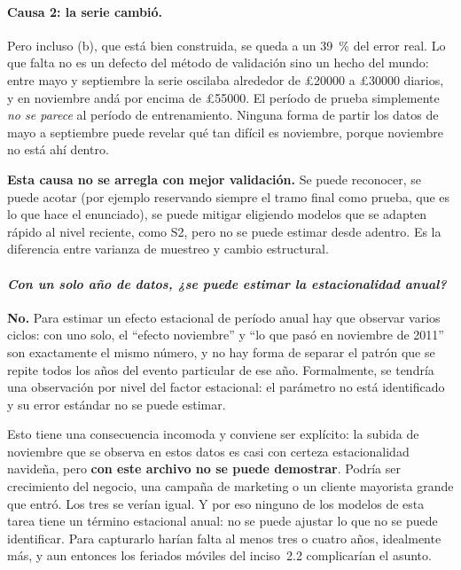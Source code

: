 \documentclass[11pt]{article}
\newcommand{\gbp}{\pounds}
\begin{document}
\paragraph{Causa 2: la serie cambi\'o.} Pero incluso (b), que est\'a bien
construida, se queda a un \SI{39}{\percent} del error real. Lo que falta no
es un defecto del m\'etodo de validaci\'on sino un hecho del mundo: entre
mayo y septiembre la serie oscilaba alrededor de \gbp\num{20000} a
\gbp\num{30000} diarios, y en noviembre and\'a por encima de
\gbp\num{55000}. El per\'iodo de prueba simplemente \emph{no se parece} al
per\'iodo de entrenamiento. Ninguna forma de partir los datos de mayo a
septiembre puede revelar qu\'e tan dif\'icil es noviembre, porque noviembre
no est\'a ah\'i dentro.

\textbf{Esta causa no se arregla con mejor validaci\'on.} Se puede
reconocer, se puede acotar (por ejemplo reservando siempre el tramo final
como prueba, que es lo que hace el enunciado), se puede mitigar eligiendo
modelos que se adapten r\'apido al nivel reciente, como S2, pero no se puede
estimar desde adentro. Es la diferencia entre varianza de muestreo y cambio
estructural.

\paragraph{{\normalfont\itshape Con un solo a\~no de datos, ¿se puede
estimar la estacionalidad anual?}} \textbf{No.} Para estimar un efecto
estacional de per\'iodo anual hay que observar varios ciclos: con uno solo,
el ``efecto noviembre'' y ``lo que pas\'o en noviembre de 2011'' son
exactamente el mismo n\'umero, y no hay forma de separar el patr\'on que se
repite todos los a\~nos del evento particular de ese a\~no. Formalmente, se
tendr\'ia una observaci\'on por nivel del factor estacional: el par\'ametro
no est\'a identificado y su error est\'andar no se puede estimar.

Esto tiene una consecuencia incomoda y conviene ser expl\'icito: la subida
de noviembre que se observa en estos datos es casi con certeza estacionalidad
navide\~na, pero \textbf{con este archivo no se puede demostrar}. Podr\'ia ser
crecimiento del negocio, una campa\~na de marketing o un cliente mayorista
grande que entr\'o. Los tres se ver\'ian igual. Y por eso ninguno de los
modelos de esta tarea tiene un t\'ermino estacional anual: no se puede
ajustar lo que no se puede identificar. Para capturarlo har\'ian falta al
menos tres o cuatro a\~nos, idealmente m\'as, y aun entonces los feriados
m\'oviles del inciso~2.2 complicar\'ian el asunto.
\end{document}
